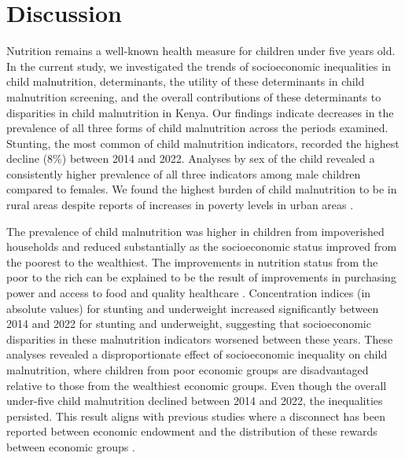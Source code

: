 \documentclass[sn-basic,Numbered,pdflatex]{sn-jnl}
\theoremstyle{remark}
\theoremstyle{definition}
\begin{document}
\hypertarget{sec12}{%
\section{Discussion}\label{sec12}}

Nutrition remains a well-known health measure for children under five
years old. In the current study, we investigated the trends of
socioeconomic inequalities in child malnutrition, determinants, the
utility of these determinants in child malnutrition screening, and the
overall contributions of these determinants to disparities in child
malnutrition in Kenya. Our findings indicate decreases in the prevalence
of all three forms of child malnutrition across the periods examined.
Stunting, the most common of child malnutrition indicators, recorded the
highest decline (8\%) between 2014 and 2022. Analyses by sex of the
child revealed a consistently higher prevalence of all three indicators
among male children compared to females. We found the highest burden of
child malnutrition to be in rural areas despite reports of increases in
poverty levels in urban areas \citep{kenya2018basic}.

The prevalence of child malnutrition was higher in children from
impoverished households and reduced substantially as the socioeconomic
status improved from the poorest to the wealthiest. The improvements in
nutrition status from the poor to the rich can be explained to be the
result of improvements in purchasing power and access to food and
quality healthcare \citep{Abuya2012}. Concentration indices (in absolute
values) for stunting and underweight increased significantly between
2014 and 2022 for stunting and underweight, suggesting that
socioeconomic disparities in these malnutrition indicators worsened
between these years. These analyses revealed a disproportionate effect
of socioeconomic inequality on child malnutrition, where children from
poor economic groups are disadvantaged relative to those from the
wealthiest economic groups. Even though the overall under-five child
malnutrition declined between 2014 and 2022, the inequalities persisted.
This result aligns with previous studies where a disconnect has been
reported between economic endowment and the distribution of these
rewards between economic groups \citep{jonah2018, May2014, mariara2009}.
\end{document}
